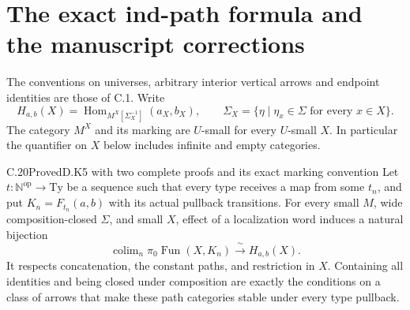 \section{The exact ind-path formula and the manuscript corrections}
\label{sec:path-manuscript}

The conventions on universes, arbitrary interior vertical arrows and
endpoint identities are those of C.1. Write
\[
 H_{a,b}(X)=\operatorname{Hom}_{M^X[\Sigma_X^{-1}]}(a_X,b_X),
 \qquad
 \Sigma_X=\{\eta\mid \eta_x\in\Sigma\text{ for every }x\in X\}.
\]
The category $M^X$ and its marking are $U$-small for every
$U$-small $X$. In particular the quantifier on $X$ below includes
infinite and empty categories.

\begin{claim}{C.20}{Proved}{D.K5 with two complete proofs and its exact marking convention}
Let $t:\mathbb N^{\mathrm{op}}\to\mathrm{Ty}$ be a sequence
such that every type receives a map from some $t_n$, and put
$K_n=F_{t_n}(a,b)$ with its actual pullback transitions. For every
small $M$, wide composition-closed $\Sigma$, and small $X$, effect
of a localization word induces a natural bijection
\[
 \operatorname{colim}_{n}\pi_0\operatorname{Fun}(X,K_n)
       \xrightarrow{\ \sim\ }H_{a,b}(X).                 \tag{C.20.1}
\]
It respects concatenation, the constant paths, and restriction in
$X$. Containing all identities and being closed under composition
are exactly the conditions on a class of arrows that make these
path categories stable under every type pullback.
\end{claim}
